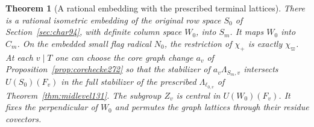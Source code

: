 \documentclass[a4paper,11pt]{article}
\newtheorem{theorem}[proposition]{Theorem}
\theoremstyle{definition}
\theoremstyle{remark}
\numberwithin{equation}{section}
\begin{document}
\begin{theorem}[A rational embedding with the prescribed terminal lattices]\leavevmode
\label{thm:graph274}
There is a rational isometric embedding of the original row
space \(S_0\) of Section~\ref{sec:char94}, with definite
column space \(W_0\), into \(S_m\). It maps \(W_0\) into
\(C_m\). On the embedded small flag radical \(N_0\), the
restriction of \(\chi_+\) is exactly \(\chi_\varpi\).
At each \(v\mid T\) one can choose the core graph change
\(a_v\) of Proposition~\ref{prop:corehecke272} so that the
stabilizer of \(a_v\Lambda_{S_m,v}\) intersects \(U(S_0)(F_v)\)
in the full stabilizer of the prescribed \(\Lambda_{\ell_{0,v}}\)
of Theorem~\ref{thm:midlevel131}. The subgroup \(Z_v\) is central
in \(U(W_0)(F_v)\). It fixes the perpendicular of \(W_0\) and
permutes the graph lattices through their residue covectors.
\end{theorem}
\end{document}
